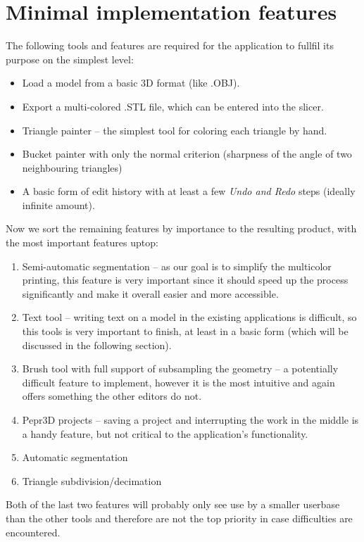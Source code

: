 \section{Minimal implementation features}

The following tools and features are required for the application to fullfil its purpose on the simplest level:

\begin{itemize}
\item Load a model from a basic 3D format (like .OBJ).
\item Export a multi-colored .STL file, which can be entered into the slicer.
\item Triangle painter -- the simplest tool for coloring each triangle by hand.
\item Bucket painter with only the normal criterion (sharpness of the angle of two neighbouring triangles)
\item A basic form of edit history with at least a few \textit{Undo and Redo} steps (ideally infinite amount).
\end{itemize}

Now we sort the remaining features by importance to the resulting product, with the most important features uptop:
\begin{enumerate}
\item Semi-automatic segmentation -- as our goal is to simplify the multicolor printing, this feature is very important since it should speed up the process significantly and make it overall easier and more accessible.
\item Text tool -- writing text on a model in the existing applications is difficult, so this tools is very important to finish, at least in a basic form (which will be discussed in the following section).
\item Brush tool with full support of subsampling the geometry -- a potentially difficult feature to implement, however it is the most intuitive and again offers something the other editors do not.
\item Pepr3D projects -- saving a project and interrupting the work in the middle is a handy feature, but not critical to the application's functionality.
\item Automatic segmentation
\item Triangle subdivision/decimation
\end{enumerate}

Both of the last two features will probably only see use by a smaller userbase than the other tools and therefore are not the top priority in case difficulties are encountered.

